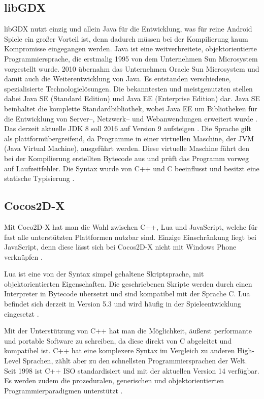 \subsection{libGDX}
\label{subsec:libGDX}
libGDX nutzt einzig und allein Java für die Entwicklung, was für reine Android Spiele ein großer Vorteil ist, denn dadurch müssen bei der Kompilierung kaum Kompromisse eingegangen werden.
Java ist eine weitverbreitete, objektorientierte Programmiersprache, die erstmalig 1995 von dem Unternehmen Sun Microsystem vorgestellt wurde. 2010 übernahm das Unternehmen Oracle Sun Microsystem und damit auch die Weiterentwicklung von Java. Es entstanden verschiedene, spezialisierte Technologielösungen. Die bekanntesten und meistgenutzten stellen dabei Java SE (Standard Edition) und Java EE (Enterprise Edition) dar. Java SE beinhaltet die komplette Standardbibliothek, wobei Java EE um Bibliotheken für die Entwicklung von Server--, Netzwerk-- und Webanwendungen erweitert wurde \citep{java_kompakt}. Das derzeit aktuelle JDK 8 soll 2016 auf Version 9 aufsteigen \citep{java_9}. 
Die Sprache gilt als plattformübergreifend, da Programme in einer virtuellen Maschine, der JVM (Java Virtual Machine), ausgeführt werden. Diese virtuelle Maschine führt den bei der Kompilierung erstellten Bytecode aus und prüft das Programm vorweg auf Laufzeitfehler. 
Die Syntax wurde von C++ und C beeinflusst und besitzt eine statische Typisierung \citep{java_kompakt}. 

\subsection{Cocos2D-X}
Mit Coco2D-X hat man die Wahl zwischen C++, Lua und JavaScript, welche für fast alle unterstützten Plattformen nutzbar sind. Einzige Einschränkung liegt bei JavaScript, denn diese lässt sich bei Cocos2D-X nicht mit Windows Phone verknüpfen \citep{cocos2d_main_features}. 

\bigskip
Lua ist eine von der Syntax simpel gehaltene Skriptsprache, mit objektorientierten Eigenschaften. Die geschriebenen Skripte werden durch einen Interpreter in Bytecode übersetzt und sind kompatibel mit der Sprache C. Lua befindet sich derzeit in Version 5.3 und wird häufig in der Spieleentwicklung eingesetzt \citep{lua_about}.

\bigskip
Mit der Unterstützung von C++ hat man die Möglichkeit, äußerst performante und portable Software zu schreiben, da diese direkt von C abgeleitet und kompatibel ist. C++ hat eine komplexere Syntax im Vergleich zu anderen High-Level Sprachen, zählt aber zu den schnellsten Programmiersprachen der Welt. Seit 1998 ist C++ ISO standardisiert und mit der aktuellen Version 14 verfügbar. Es werden zudem die prozeduralen, generischen und objektorientierten Programmierparadigmen unterstützt \citep{cplusplus}. 


